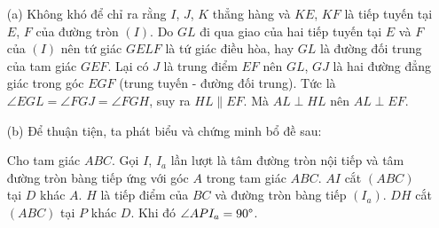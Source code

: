         \begin{solution}
            \hfill
            \begin{enumerate}
                \item[(a)] Không khó để chỉ ra rằng \(I\), \(J\), \(K\) thẳng hàng và \(KE\), \(KF\) là tiếp tuyến tại \(E\), \(F\) của đường tròn \((I)\). Do \(GL\) đi qua giao của hai tiếp tuyến tại \(E\) và \(F\) của \((I)\) nên tứ giác \(GELF\) là tứ giác điều hòa, hay \(GL\) là đường đối trung của tam giác \(GEF\). Lại có \(J\) là trung điểm \(EF\) nên \(GL\), \(GJ\) là hai đường đẳng giác trong góc \(EGF\) (trung tuyến - đường đối trung). Tức là \(\angle EGL = \angle FGJ = \angle FGH\), suy ra \(HL \parallel EF\). Mà \(AL \perp HL\) nên \(AL \perp EF\).
                \item[(b)] Để thuận tiện, ta phát biểu và chứng minh bổ đề sau:
                \begin{lemma}
                    Cho tam giác \(ABC\). Gọi \(I\), \(I_a\) lần lượt là tâm đường tròn nội tiếp và tâm đường tròn bàng tiếp ứng với góc \(A\) trong tam giác \(ABC\). \(AI\) cắt \((ABC)\) tại \(D\) khác \(A\). \(H\) là tiếp điểm của \(BC\) và đường tròn bàng tiếp \((I_a)\). \(DH\) cắt \((ABC)\) tại \(P\) khác \(D\). Khi đó \(\angle API_a = 90 \degree\).
                \end{lemma}
                \begin{center}
\end{center}
\end{enumerate}
\end{solution}

